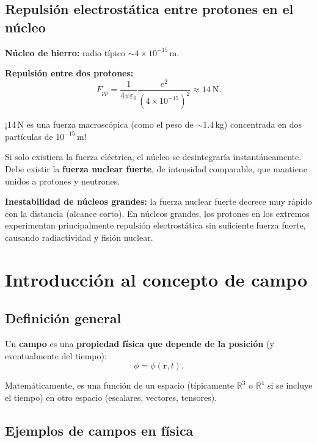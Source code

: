 \documentclass[12pt,a4paper]{article}
\begin{document}
\subsection{Repulsión electrostática entre protones en el núcleo}

\textbf{Núcleo de hierro:} radio típico $\sim 4 \times 10^{-15}$\,m.

\textbf{Repulsión entre dos protones:}
\[
F_{pp} = \frac{1}{4\pi\varepsilon_0}
         \frac{e^{2}}{(4 \times 10^{-15})^{2}}
       \approx 14\ \text{N}.
\]

¡14\,N es una fuerza macroscópica (como el peso de $\sim 1.4$\,kg)
concentrada en dos partículas de $10^{-15}$\,m!

\begin{keybox}[Implicación]
  Si solo existiera la fuerza eléctrica, el núcleo se desintegraría
  instantáneamente. Debe existir la \textbf{fuerza nuclear fuerte}, de
  intensidad comparable, que mantiene unidos a protones y neutrones.
\end{keybox}

\textbf{Inestabilidad de núcleos grandes:} la fuerza nuclear fuerte
decrece muy rápido con la distancia (alcance corto). En núcleos grandes,
los protones en los extremos experimentan principalmente repulsión
electrostática sin suficiente fuerza fuerte, causando radiactividad y
fisión nuclear.

\section{Introducción al concepto de campo}

\subsection{Definición general}

Un \textbf{campo} es una \textbf{propiedad física que depende de la
posición} (y eventualmente del tiempo):
\[
\phi = \phi(\mathbf{r}, t).
\]

Matemáticamente, es una función de un espacio (típicamente $\mathbb{R}^{3}$
o $\mathbb{R}^{4}$ si se incluye el tiempo) en otro espacio (escalares,
vectores, tensores).

\subsection{Ejemplos de campos en física}
\end{document}
